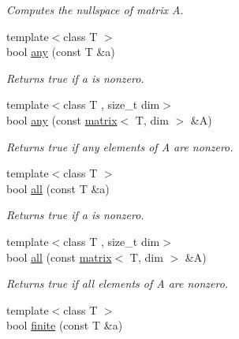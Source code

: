 \begin{DoxyCompactItemize}
\begin{DoxyCompactList}\small\item\em Computes the nullspace of matrix A. \end{DoxyCompactList}\item 
\hypertarget{namespacekeycpp_a70b89ab3e8f66f86c47c3bde004d4487}{{\footnotesize template$<$class T $>$ }\\bool \hyperlink{namespacekeycpp_a70b89ab3e8f66f86c47c3bde004d4487}{any} (const T \&a)}\label{namespacekeycpp_a70b89ab3e8f66f86c47c3bde004d4487}

\begin{DoxyCompactList}\small\item\em Returns true if a is nonzero. \end{DoxyCompactList}\item 
\hypertarget{namespacekeycpp_a7c36622975d56232740753ada20b9f86}{{\footnotesize template$<$class T , size\-\_\-t dim$>$ }\\bool \hyperlink{namespacekeycpp_a7c36622975d56232740753ada20b9f86}{any} (const \hyperlink{classkeycpp_1_1matrix}{matrix}$<$ T, dim $>$ \&A)}\label{namespacekeycpp_a7c36622975d56232740753ada20b9f86}

\begin{DoxyCompactList}\small\item\em Returns true if any elements of A are nonzero. \end{DoxyCompactList}\item 
\hypertarget{namespacekeycpp_aab77d82d9cc7d1fcca87967048f09e0e}{{\footnotesize template$<$class T $>$ }\\bool \hyperlink{namespacekeycpp_aab77d82d9cc7d1fcca87967048f09e0e}{all} (const T \&a)}\label{namespacekeycpp_aab77d82d9cc7d1fcca87967048f09e0e}

\begin{DoxyCompactList}\small\item\em Returns true if a is nonzero. \end{DoxyCompactList}\item 
\hypertarget{namespacekeycpp_a30bc3707493ba61f2165a189e7cbafd4}{{\footnotesize template$<$class T , size\-\_\-t dim$>$ }\\bool \hyperlink{namespacekeycpp_a30bc3707493ba61f2165a189e7cbafd4}{all} (const \hyperlink{classkeycpp_1_1matrix}{matrix}$<$ T, dim $>$ \&A)}\label{namespacekeycpp_a30bc3707493ba61f2165a189e7cbafd4}

\begin{DoxyCompactList}\small\item\em Returns true if all elements of A are nonzero. \end{DoxyCompactList}\item 
\hypertarget{namespacekeycpp_ac60465b61314a3baea857cf9d3579524}{{\footnotesize template$<$class T $>$ }\\bool \hyperlink{namespacekeycpp_ac60465b61314a3baea857cf9d3579524}{finite} (const T \&a)}\label{namespacekeycpp_ac60465b61314a3baea857cf9d3579524}


\end{DoxyCompactItemize}
